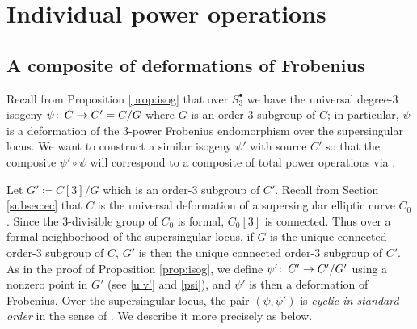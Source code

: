 \documentclass{gtpart}
\theoremstyle{definition}
\theoremstyle{remark}
\def\co{\colon\thinspace}
\newcommand{\s}{S^\bullet}
\begin{document}
\section{Individual power operations}
\label{sec:individual}

\subsection{A composite of deformations of Frobenius}

Recall from Proposition \ref{prop:isog} that over $\s_3$ we have the 
universal degree-3 isogeny $\psi \co C \to C' = C/G$ where $G$ is an 
order-3 subgroup of $C$; in particular, $\psi$ is a deformation of the 
3-power Frobenius endomorphism over the supersingular locus.  We want to 
construct a similar isogeny $\psi'$ with source $C'$ so that the 
composite $\psi' \circ \psi$ will correspond to a composite of total 
power operations via \cite[Theorem B]{cong}.  

Let $G' \coloneqq C[3]/G$ which is an order-3 subgroup of $C'$.  Recall 
from Section \ref{subsec:ec} that $C$ is the universal deformation of a 
supersingular elliptic curve $C_0$.  Since the 3-divisible group of 
$C_0$ is formal, $C_0[3]$ is connected.  Thus over a formal neighborhood 
of the supersingular locus, if $G$ is the unique connected order-3 
subgroup of $C$, $G'$ is then the unique connected order-3 subgroup of 
$C'$.  As in the proof of Proposition \ref{prop:isog}, we define 
$\psi' \co C' \to C'/G'$ using a nonzero point in $G'$ (see \eqref{u'v'} 
and \eqref{psi}), and $\psi'$ is then a deformation of Frobenius.  Over 
the supersingular locus, the pair $(\psi, \psi')$ is {\em cyclic in 
standard order} in the sense of \cite[6.7.7]{KM}.  We describe it more 
precisely as below.  
\end{document}
